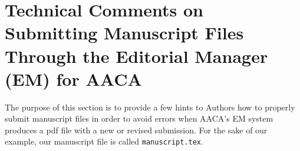 \documentclass{birkjour}
\theoremstyle{definition}
\theoremstyle{remark}
\newtheorem{comment}[thm]{Comment}
\numberwithin{equation}{section}
\begin{document}
\section{Technical Comments on Submitting Manuscript Files Through 
the Editorial Manager (EM) for AACA} 
\label{sec:technicalcomments}

The purpose of this section is to provide a few hints to Authors how to properly submit manuscript files in order to avoid errors when AACA's EM system produces a pdf file with a new or revised submission. For the sake of our example, our manuscript file is called \texttt{manuscript.tex}.

\begin{comment}
Before you attempt to upload your manuscript files, please make sure that when you typeset your document on your local system, no errors are being reported in \texttt{manuscript.log} file. In particular, that all your citation commands \verb!\cite{...}! create correct reference numbers like \cite{paper}, \cite{latex}, \cite{paper,latex,scharler}, etc. instead of \texttt{[?]}.
\end{comment} 

\begin{comment}
While AACA does not require that original submissions are typeset in \LaTeX\ using \texttt{birkjour.cls} class file, or, typeset in \LaTeX\ at all, e.g., they could be typed in MS Word, when the manuscript is accepted for publication, its final version will have to be typeset by the author in \LaTeX\ using \texttt{birkjour.cls}. 
\end{comment}

\begin{comment}
To avoid time delays after the manuscript is accepted, it is faster to submit the original (or, at least its revision, if requested by the Editor) typeset in \LaTeX\ with \texttt{birkjour.cls} as it will later shorten the time before the accepted paper gets published. Also, referees often comment on improper \LaTeX\ usage or features not particular to the \texttt{birkjour.cls} style. This then takes more time for them to submit their reviews.
\end{comment}
\end{document}
